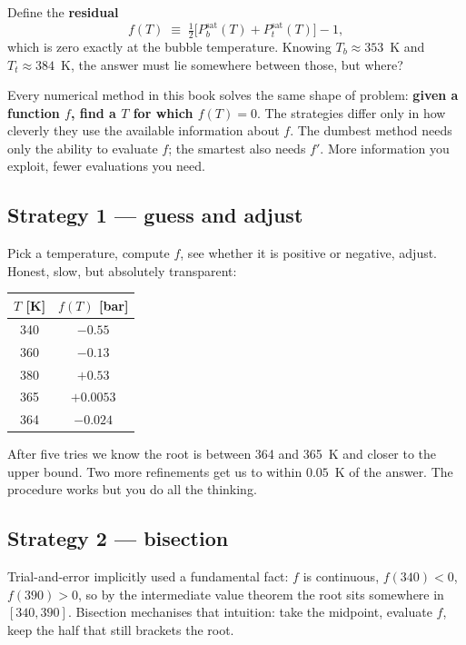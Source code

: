 \documentclass[11pt,a4paper]{article}
\begin{document}
Define the \textbf{residual}
\begin{equation}
   f(T) \;\equiv\; \tfrac{1}{2}\bigl[P^{\mathrm{sat}}_b(T) + P^{\mathrm{sat}}_t(T)\bigr] - 1,
\end{equation}
which is zero exactly at the bubble temperature.  Knowing $T_b
\approx 353$~K and $T_t \approx 384$~K, the answer must lie somewhere
between those, but where?

\begin{intuition}
Every numerical method in this book solves the same shape of problem:
\textbf{given a function $f$, find a $T$ for which $f(T) = 0$}.  The
strategies differ only in how cleverly they use the available
information about $f$.  The dumbest method needs only the ability to
evaluate $f$; the smartest also needs $f'$.  More information you
exploit, fewer evaluations you need.
\end{intuition}

\subsection{Strategy 1 --- guess and adjust}

Pick a temperature, compute $f$, see whether it is positive or
negative, adjust.  Honest, slow, but absolutely transparent:

\begin{center}
\small
\begin{tabular}{cc}
\toprule
$T$ [K] & $f(T)$ [bar]\\
\midrule
340 & $-0.55$ \\
360 & $-0.13$ \\
380 & $+0.53$ \\
365 & $+0.0053$ \\
364 & $-0.024$ \\
\bottomrule
\end{tabular}
\end{center}

After five tries we know the root is between 364 and 365~K and
closer to the upper bound.  Two more refinements get us to within
$0.05$~K of the answer.  The procedure works but you do all the
thinking.

\subsection{Strategy 2 --- bisection}

Trial-and-error implicitly used a fundamental fact: $f$ is
continuous, $f(340) < 0$, $f(390) > 0$, so by the intermediate
value theorem the root sits somewhere in $[340, 390]$.  Bisection
mechanises that intuition: take the midpoint, evaluate $f$, keep
the half that still brackets the root.
\end{document}
